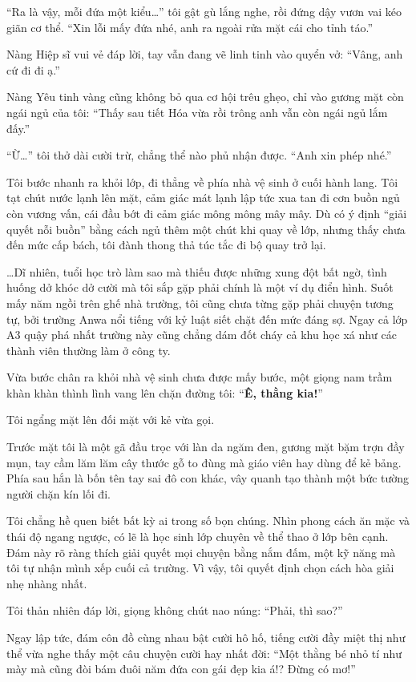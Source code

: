 \documentclass[../main.tex]{subfiles}
\begin{document}
``Ra là vậy, mỗi đứa một kiểu\dots'' tôi gật gù lắng nghe, rồi đứng dậy vươn vai kéo giãn cơ thể. ``Xin lỗi mấy đứa nhé, anh ra ngoài rửa mặt cái cho tỉnh táo.''

Nàng Hiệp sĩ vui vẻ đáp lời, tay vẫn đang vẽ linh tinh vào quyển vở: ``Vâng, anh cứ đi đi ạ.''

Nàng Yêu tinh vàng cũng không bỏ qua cơ hội trêu ghẹo, chỉ vào gương mặt còn ngái ngủ của tôi: ``Thấy sau tiết Hóa vừa rồi trông anh vẫn còn ngái ngủ lắm đấy.''

``Ừ\dots'' tôi thở dài cười trừ, chẳng thể nào phủ nhận được. ``Anh xin phép nhé.''

Tôi bước nhanh ra khỏi lớp, đi thẳng về phía nhà vệ sinh ở cuối hành lang. Tôi tạt chút nước lạnh lên mặt, cảm giác mát lạnh lập tức xua tan đi cơn buồn ngủ còn vương vấn, cái đầu bớt đi cảm giác mông mông mây mây. Dù có ý định ``giải quyết nỗi buồn'' bằng cách ngủ thêm một chút khi quay về lớp, nhưng thấy chưa đến mức cấp bách, tôi đành thong thả túc tắc đi bộ quay trở lại.

\dots Dĩ nhiên, tuổi học trò làm sao mà thiếu được những xung đột bất ngờ, tình huống dở khóc dở cười mà tôi sắp gặp phải chính là một ví dụ điển hình. Suốt mấy năm ngồi trên ghế nhà trường, tôi cũng chưa từng gặp phải chuyện tương tự, bởi trường Anwa nổi tiếng với kỷ luật siết chặt đến mức đáng sợ. Ngay cả lớp A3 quậy phá nhất trường này cũng chẳng dám đốt cháy cả khu học xá như các thành viên thường làm ở công ty.

Vừa bước chân ra khỏi nhà vệ sinh chưa được mấy bước, một giọng nam trầm khàn khàn thình lình vang lên chặn đường tôi: ``\textbf{Ê, thằng kia!}''

Tôi ngẩng mặt lên đối mặt với kẻ vừa gọi.

Trước mặt tôi là một gã đầu trọc với làn da ngăm đen, gương mặt bặm trợn đầy mụn, tay cầm lăm lăm cây thước gỗ to đùng mà giáo viên hay dùng để kẻ bảng. Phía sau hắn là bốn tên tay sai đô con khác, vây quanh tạo thành một bức tường người chặn kín lối đi.

Tôi chẳng hề quen biết bất kỳ ai trong số bọn chúng. Nhìn phong cách ăn mặc và thái độ ngang ngược, có lẽ là học sinh lớp chuyên về thể thao ở lớp bên cạnh. Đám này rõ ràng thích giải quyết mọi chuyện bằng nắm đấm, một kỹ năng mà tôi tự nhận mình xếp cuối cả trường. Vì vậy, tôi quyết định chọn cách hòa giải nhẹ nhàng nhất.

Tôi thản nhiên đáp lời, giọng không chút nao núng: ``Phải, thì sao?''

Ngay lập tức, đám côn đồ cùng nhau bật cười hô hố, tiếng cười đầy miệt thị như thể vừa nghe thấy một câu chuyện cười hay nhất đời: ``Một thằng bé nhỏ tí như mày mà cũng đòi bám đuôi năm đứa con gái đẹp kia á!? Đừng có mơ!''
\end{document}
